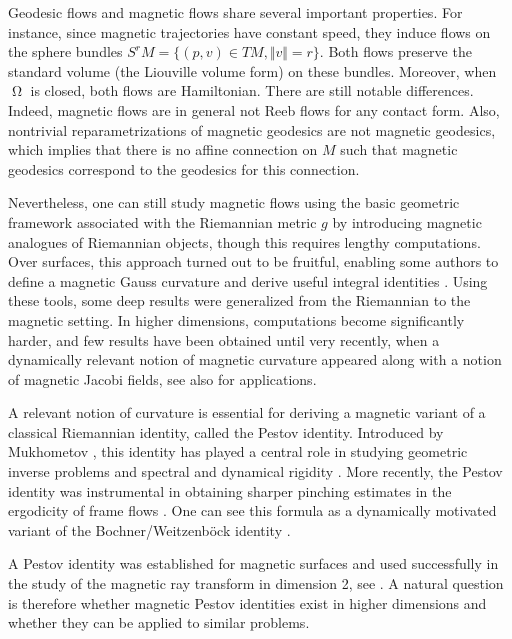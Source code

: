 \documentclass[12pt]{amsart}
\numberwithin{numbering}{section}
\theoremstyle{plain}
\theoremstyle{definition}
\theoremstyle{remark}
\numberwithin{equation}{section}
\DeclareMathOperator{\mg}{\Omega}
\begin{document}
Geodesic flows and magnetic flows share several important properties. For instance, since magnetic trajectories have constant speed, they induce flows on the sphere bundles $S^r M = \{(p, v) \in TM, \Vert v \Vert = r\}$. Both flows preserve the standard volume (the Liouville volume form) on these bundles. Moreover, when $\mg$ is closed, both flows are Hamiltonian. There are still notable differences. Indeed, magnetic flows are in general not Reeb flows for any contact form. Also, nontrivial reparametrizations of magnetic geodesics are not magnetic geodesics, which implies that there is no affine connection on $M$ such that magnetic geodesics correspond to the geodesics for this connection.

Nevertheless, one can still study magnetic flows using the basic geometric framework associated with the Riemannian metric $g$ by introducing magnetic analogues of Riemannian objects, though this requires lengthy computations. Over surfaces, this approach turned out to be fruitful, enabling some authors to define a magnetic Gauss curvature and derive useful integral identities \cite{merry2011inverse}. Using these tools, some deep results \cite{assenza2024marked,echevarria2025rigidity} were generalized from the Riemannian to the magnetic setting. In higher dimensions, computations become significantly harder, and few results have been obtained until very recently, when a dynamically relevant notion of magnetic curvature appeared \cite{assenza2024magnetic,assenza2025hopf, terek2026magnetic} along with a notion of magnetic Jacobi fields, see also \cite{reber2026finiteness, beaufort2026rigidity} for applications. 

\medskip

A relevant notion of curvature is essential for deriving a magnetic variant of a classical Riemannian identity, called the Pestov identity. Introduced by Mukhometov \cite{mukhometov1975inverse}, this identity has played a central role in studying geometric inverse problems and spectral and dynamical rigidity \cite{guillemin1980inverse, croke1998rigidity, dairbekov2003integral, pestov2005rigid, paternain2013tomography, guillarmou2019length}. More recently, the Pestov identity was instrumental in obtaining sharper pinching estimates in the ergodicity of frame flows \cite{cekic2024frame,cekic2024unitary}. One can see this formula as a dynamically motivated variant of the Bochner/Weitzenböck identity \cite{cekic2025correspondence}.

A Pestov identity was established for magnetic surfaces and used successfully in the study of the magnetic ray transform in dimension 2, see \cite{ainsworth2013magnetic}. A natural question is therefore whether magnetic Pestov identities exist in higher dimensions and whether they can be applied to similar problems.
\end{document}
